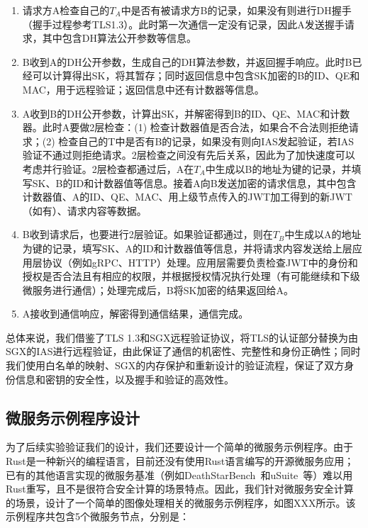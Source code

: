 \begin{enumerate}
    \item 请求方A检查自己的$T_A$中是否有被请求方B的记录，如果没有则进行DH握手（握手过程参考TLS1.3）。此时第一次通信一定没有记录，因此A发送握手请求，其中包含DH算法公开参数等信息。
    \item B收到A的DH公开参数，生成自己的DH算法参数，并返回握手响应。此时B已经可以计算得出SK，将其暂存；同时返回信息中包含SK加密的B的ID、QE和MAC，用于远程验证；返回信息中还有计数器等信息。
    \item A收到B的DH公开参数，计算出SK，并解密得到B的ID、QE、MAC和计数器。此时A要做2层检查：(1) 检查计数器值是否合法，如果合不合法则拒绝请求；(2) 检查自己的T中是否有B的记录，如果没有则向IAS发起验证，若IAS验证不通过则拒绝请求。2层检查之间没有先后关系，因此为了加快速度可以考虑并行验证。2层检查都通过后，A在$T_A$中生成以B的地址为键的记录，并填写SK、B的ID和计数器值等信息。接着A向B发送加密的请求信息，其中包含计数器值、A的ID、QE、MAC、用上级节点传入的JWT加工得到的新JWT（如有）、请求内容等数据。
    \item B收到请求后，也要进行2层验证。如果验证都通过，则在$T_B$中生成以A的地址为键的记录，填写SK、A的ID和计数器值等信息，并将请求内容发送给上层应用层协议（例如gRPC、HTTP）处理。应用层需要负责检查JWT中的身份和授权是否合法且有相应的权限，并根据授权情况执行处理（有可能继续和下级微服务进行通信）；处理完成后，B将SK加密的结果返回给A。
    \item A接收到通信响应，解密得到通信结果，通信完成。
\end{enumerate}

总体来说，我们借鉴了TLS 1.3和SGX远程验证协议，将TLS的认证部分替换为由SGX的IAS进行远程验证，由此保证了通信的机密性、完整性和身份正确性；同时我们使用白名单的映射、SGX的内存保护和重新设计的验证流程，保证了双方身份信息和密钥的安全性，以及握手和验证的高效性。

\subsection{微服务示例程序设计}\label{subsec:ms-example}

为了后续实验验证我们的设计，我们还要设计一个简单的微服务示例程序。由于Rust是一种新兴的编程语言，目前还没有使用Rust语言编写的开源微服务应用；已有的其他语言实现的微服务基准（例如DeathStarBench~\cite{}和uSuite~\cite{}等）难以用Rust重写，且不是很符合安全计算的场景特点。因此，我们针对微服务安全计算的场景，设计了一个简单的图像处理相关的微服务示例程序，如图XXX所示。该示例程序共包含5个微服务节点，分别是：%

